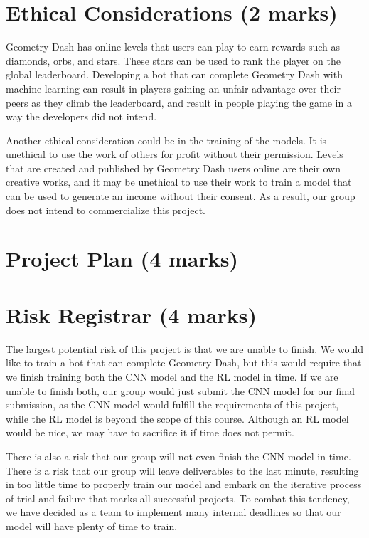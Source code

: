 \documentclass{article}
\begin{document}
\section{Ethical Considerations (2 marks)}
Geometry Dash has online levels that users can play to earn rewards 
such as diamonds, orbs, and stars. These stars can be used to rank 
the player on the global leaderboard. Developing a bot that can complete 
Geometry Dash with machine learning can result in players gaining an 
unfair advantage over their peers as they climb the leaderboard, and 
result in people playing the game in a way the developers did not intend.

Another ethical consideration could be in the training of the models. 
It is unethical to use the work of others for profit without their 
permission. Levels that are created and published by Geometry Dash 
users online are their own creative works, and it may be unethical to 
use their work to train a model that can be used to generate an income 
without their consent. As a result, our group does not intend to 
commercialize this project.


\section{Project Plan (4 marks)}

\section{Risk Registrar (4 marks)}
The largest potential risk of this project is that we are unable to 
finish. We would like to train a bot that can complete Geometry Dash, 
but this would require that we finish training both the CNN model and 
the RL model in time. If we are unable to finish both, our group would 
just submit the CNN model for our final submission, as the CNN model 
would fulfill the requirements of this project, while the RL model is 
beyond the scope of this course. Although an RL model would be nice, 
we may have to sacrifice it if time does not permit. 

There is also a risk that our group will not even finish the CNN model 
in time. There is a risk that our group will leave deliverables to the 
last minute, resulting in too little time to properly train our model 
and embark on the iterative process of trial and failure that marks all
successful projects. To combat this tendency, we have decided as a team 
to implement many internal deadlines so that our model will have plenty 
of time to train.
\end{document}
